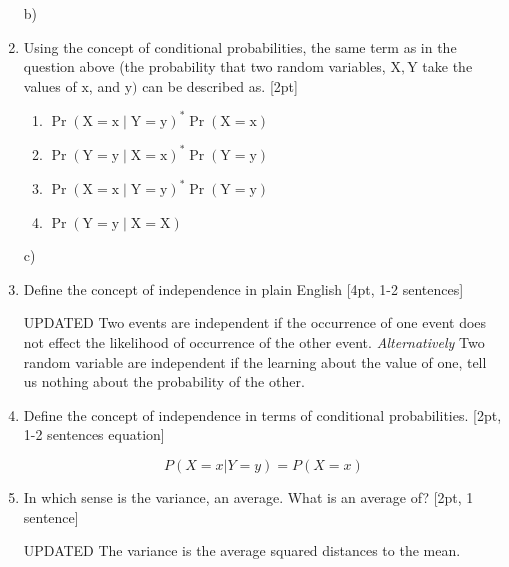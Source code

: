\documentclass[answers]{exam}
\begin{document}
\begin{enumerate}
 \begin{solution}
 b)
 \end{solution}
 
\item Using the concept of conditional probabilities, the same term as in the question above (the probability that two random variables, $\mathrm{X}, \mathrm{Y}$ take the values of $\mathrm{x}$, and $\mathrm{y})$ can be described as. [2pt]
\begin{enumerate}[label=\alph*)]
    \item $\operatorname{Pr}(\mathrm{X}=\mathrm{x} \mid \mathrm{Y}=\mathrm{y})^{*} \operatorname{Pr}(\mathrm{X}=\mathrm{x})$
    \item $\operatorname{Pr}(\mathrm{Y}=\mathrm{y} \mid \mathrm{X}=\mathrm{x})^{*} \operatorname{Pr}(\mathrm{Y}=\mathrm{y})$
    \item $\operatorname{Pr}(\mathrm{X}=\mathrm{x} \mid \mathrm{Y}=\mathrm{y})^{*} \operatorname{Pr}(\mathrm{Y}=\mathrm{y})$
    \item $\operatorname{Pr}(\mathrm{Y}=\mathrm{y} \mid \mathrm{X}=\mathrm{X})$
\end{enumerate}

\begin{solution}
c)
\end{solution}



\item Define the concept of independence in plain English [4pt, 1-2 sentences]
\begin{solution}
UPDATED Two events are independent if the occurrence of one event does not effect the likelihood of occurrence of the other event. \textit{Alternatively} Two random variable are independent if the learning about the value of one, tell us nothing about the probability of the other. 
\end{solution}

    \item Define the concept of independence in terms of conditional probabilities. [2pt, 1-2 sentences equation] 
    
    \begin{solution}
    $$ P(X=x|Y=y)=P(X=x)$$
    \end{solution}
    



	\item In which sense is the variance, an average. What is an average of? [2pt, 1 sentence]
	
	\begin{solution}
UPDATED	The variance is the average squared distances to the mean.
	\end{solution}
	


\end{enumerate}
\end{document}
